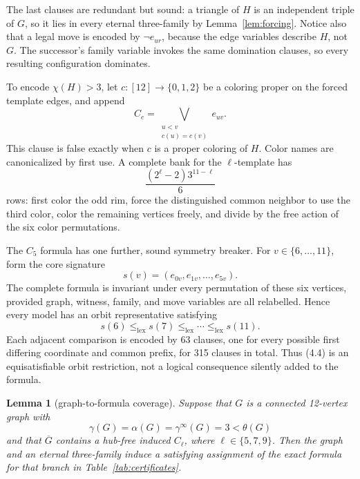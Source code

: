 \documentclass[11pt]{article}
\newtheorem{lemma}[theorem]{Lemma}
\theoremstyle{definition}
\theoremstyle{remark}
\newcommand{\gaminf}{\gamma^{\infty}}
\begin{document}
The last clauses are redundant but sound: a triangle of \(H\) is an
independent triple of \(G\), so it lies in every eternal three-family by
Lemma~\ref{lem:forcing}.  Notice also that a legal move is encoded by
\(\neg e_{ur}\), because the edge variables describe \(H\), not \(G\).
The successor's family variable invokes the same domination clauses, so
every resulting configuration dominates.

To encode \(\chi(H)>3\), let \(c:[12]\to\{0,1,2\}\) be a coloring proper on
the forced template edges, and append
\[
  C_c=\bigvee_{\substack{u<v\\c(u)=c(v)}}e_{uv}.
\tag{4.2}
\]
This clause is false exactly when \(c\) is a proper coloring of \(H\).
Color names are canonicalized by first use.  A complete bank for the
\(\ell\)-template has
\[
  \frac{(2^\ell-2)3^{11-\ell}}{6}
\tag{4.3}
\]
rows: first color the odd rim, force the distinguished common neighbor to
use the third color, color the remaining vertices freely, and divide by the
free action of the six color permutations.

The \(C_5\) formula has one further, sound symmetry breaker.  For
\(v\in\{6,\ldots,11\}\), form the core signature
\[
  s(v)=(e_{0v},e_{1v},\ldots,e_{5v}).
\]
The complete formula is invariant under every permutation of these six
vertices, provided graph, witness, family, and move variables are all
relabelled.  Hence every model has an orbit representative satisfying
\[
  s(6)\leq_{\mathrm{lex}}s(7)\leq_{\mathrm{lex}}\cdots
  \leq_{\mathrm{lex}}s(11).
\tag{4.4}
\]
Each adjacent comparison is encoded by 63 clauses, one for every possible
first differing coordinate and common prefix, for 315 clauses in total.
Thus (4.4) is an equisatisfiable orbit restriction, not a logical
consequence silently added to the formula.

\begin{lemma}[graph-to-formula coverage]\label{lem:coverage}
Suppose that \(G\) is a connected 12-vertex graph with
\[
  \gamma(G)=\alpha(G)=\gaminf(G)=3<\theta(G)
\tag{4.5}
\]
and that \(\overline G\) contains a hub-free induced \(C_\ell\), where
\(\ell\in\{5,7,9\}\).  Then the graph and an eternal three-family induce a
satisfying assignment of the exact formula for that branch in
Table~\ref{tab:certificates}.
\end{lemma}
\end{document}
